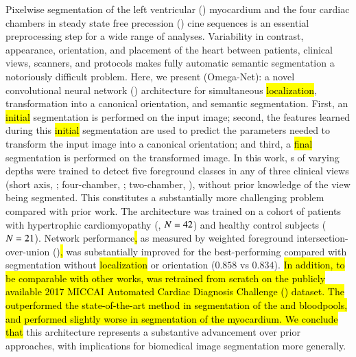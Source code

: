 
Pixelwise segmentation of the left ventricular (\LV{}) myocardium and the four cardiac chambers in  steady state free precession (\SSFP{}) cine sequences is an essential preprocessing step for a wide range of analyses.
Variability in contrast, appearance, orientation, and placement of the heart between patients, clinical views, scanners, and protocols makes fully automatic semantic segmentation a notoriously difficult problem.
Here, we present \omeganet{} (Omega-Net): a novel convolutional neural network (\CNN{}) architecture for simultaneous \hl{localization}, transformation into a canonical orientation, and semantic segmentation.
First, an \hl{initial} segmentation is performed on the input image; second, the features learned during this \hl{initial} segmentation are used to predict the parameters needed to transform the input image into a canonical orientation; and third, a \hl{final} segmentation is performed on the transformed image.
In this work, \omeganet{}s of varying depths were trained to detect five foreground classes in any of three clinical views (short axis, \SA{}; four-chamber, \HLA{}; two-chamber, \VLA{}), without prior knowledge of the view being segmented.
This constitutes a substantially more challenging problem compared with prior work.
The architecture was trained on a cohort of patients with hypertrophic cardiomyopathy (\HCM{}, $N = 42{}$) and healthy control subjects ($N = 21{}$).
Network performance\hl{,} as measured by weighted foreground intersection-over-union (\IoU{})\hl{,} was substantially improved for the best-performing \omeganet{} compared with \UNet{} segmentation without \hl{localization} or orientation ($0.858$ vs $0.834$).
\hl{
In addition, to be comparable with other works, \omeganet{} \hl{was retrained} from scratch on the publicly available 2017 MICCAI Automated Cardiac Diagnosis Challenge (\miccaidata{}) dataset.
The \omeganet{} outperformed the state-of-the-art method in segmentation of the \LV{} and \RV{} bloodpools, and performed slightly worse in segmentation of the \LV{} myocardium.
We conclude that} this architecture represents a substantive advancement over prior approaches, with implications for biomedical image segmentation more generally.


